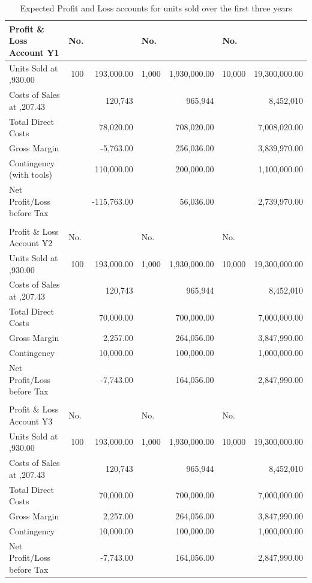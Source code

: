 \documentclass[a4paper,11pt]{article}
\begin{document}
\begin{table}[!ht]
	\centering
	\caption{Expected Profit and Loss accounts for units sold over the first three years}
	\begin{tabular}{l r r r r r r}	
		\hline
		Profit \& Loss Account Y1&\multicolumn{1}{l}{No.}&\multicolumn{1}{l}{\textsterling}&\multicolumn{1}{l}{No.}&\multicolumn{1}{l}{\textsterling}&\multicolumn{1}{l}{No.}&\multicolumn{1}{l}{\textsterling}\\ \hline
		Units Sold at \textsterling 1,930.00&100&193,000.00&1,000&1,930,000.00&10,000&19,300,000.00\\
		Costs of Sales at \textsterling 1,207.43&&120,743&&965,944&&8,452,010\\
		Total Direct Costs&&78,020.00&&708,020.00&&7,008,020.00\\
		Gross Margin&&-5,763.00&&256,036.00&&3,839,970.00\\
		Contingency (with tools)&&110,000.00&&200,000.00&&1,100,000.00\\
		Net Profit/Loss before Tax&&-115,763.00&&56,036.00&&2,739,970.00\\
					  &&&&&&\\ \hline
		Profit \& Loss Account Y2&\multicolumn{1}{l}{No.}&\multicolumn{1}{l}{\textsterling}&\multicolumn{1}{l}{No.}&\multicolumn{1}{l}{\textsterling}&\multicolumn{1}{l}{No.}&\multicolumn{1}{l}{\textsterling}\\ \hline
		Units Sold at \textsterling 1,930.00&100&193,000.00&1,000&1,930,000.00&10,000&19,300,000.00\\
		Costs of Sales at \textsterling 1,207.43&&120,743&&965,944&&8,452,010\\
		Total Direct Costs&&70,000.00&&700,000.00&&7,000,000.00\\
		Gross Margin&&2,257.00&&264,056.00&&3,847,990.00\\
		Contingency&&10,000.00&&100,000.00&&1,000,000.00\\
		Net Profit/Loss before Tax&&-7,743.00&&164,056.00&&2,847,990.00\\
					  &&&&&&\\ \hline
		Profit \& Loss Account Y3&\multicolumn{1}{l}{No.}&\multicolumn{1}{l}{\textsterling}&\multicolumn{1}{l}{No.}&\multicolumn{1}{l}{\textsterling}&\multicolumn{1}{l}{No.}&\multicolumn{1}{l}{\textsterling}\\ \hline
		Units Sold at \textsterling 1,930.00&100&193,000.00&1,000&1,930,000.00&10,000&19,300,000.00\\
		Costs of Sales at \textsterling 1,207.43&&120,743&&965,944&&8,452,010\\
		Total Direct Costs&&70,000.00&&700,000.00&&7,000,000.00\\
		Gross Margin&&2,257.00&&264,056.00&&3,847,990.00\\
		Contingency&&10,000.00&&100,000.00&&1,000,000.00\\
		Net Profit/Loss before Tax&&-7,743.00&&164,056.00&&2,847,990.00\\
	\end{tabular}
	\label{tab:PLA}
\end{table}
\end{document}
